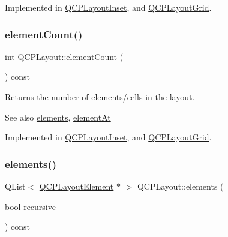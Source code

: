 Implemented in \mbox{\hyperlink{class_q_c_p_layout_inset_a881ca205605bae9c034733b808f93a02}{Q\+C\+P\+Layout\+Inset}}, and \mbox{\hyperlink{class_q_c_p_layout_grid_a4288f174082555f6bd92021bdedb75dc}{Q\+C\+P\+Layout\+Grid}}.

\mbox{\label{class_q_c_p_layout_a39d3e9ef5d9b82ab1885ba1cb9597e56}} 
\subsubsection{\texorpdfstring{elementCount()}{elementCount()}}
{\footnotesize\ttfamily int Q\+C\+P\+Layout\+::element\+Count (\begin{DoxyParamCaption}{ }\end{DoxyParamCaption}) const\hspace{0.3cm}{\ttfamily [pure virtual]}}

Returns the number of elements/cells in the layout.

\begin{DoxySeeAlso}{See also}
\mbox{\hyperlink{class_q_c_p_layout_aca129722c019f91d3367046f80abfa77}{elements}}, \mbox{\hyperlink{class_q_c_p_layout_afa73ca7d859f8a3ee5c73c9b353d2a56}{element\+At}} 
\end{DoxySeeAlso}


Implemented in \mbox{\hyperlink{class_q_c_p_layout_inset_a7f5aa4d48a2e844cfe6dd7ed8f0861df}{Q\+C\+P\+Layout\+Inset}}, and \mbox{\hyperlink{class_q_c_p_layout_grid_a9a8942aface780a02445ebcf14c48513}{Q\+C\+P\+Layout\+Grid}}.

\mbox{\label{class_q_c_p_layout_aca129722c019f91d3367046f80abfa77}} 
\subsubsection{\texorpdfstring{elements()}{elements()}}
{\footnotesize\ttfamily Q\+List$<$ \mbox{\hyperlink{class_q_c_p_layout_element}{Q\+C\+P\+Layout\+Element}} $\ast$ $>$ Q\+C\+P\+Layout\+::elements (\begin{DoxyParamCaption}\item[{bool}]{recursive }\end{DoxyParamCaption}) const\hspace{0.3cm}{\ttfamily [virtual]}}

